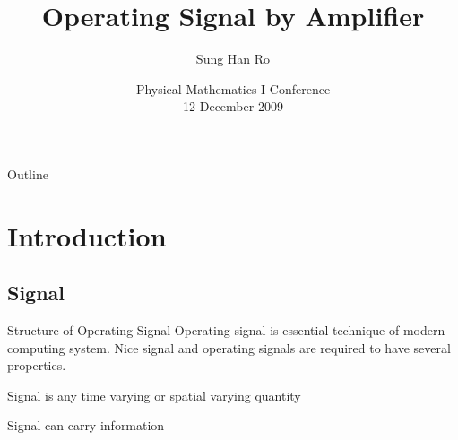 \documentclass[9pt]{beamer}
\begin{document}
\title{Operating Signal by Amplifier}
\author{Sung Han Ro}
\date{Physical Mathematics I Conference\\
12 December 2009}
\begin{frame}
\titlepage
\end{frame}
\begin{frame}{Outline}
\tableofcontents
\end{frame}

\section{Introduction}

\subsection{Signal}
\begin{frame}{Structure of Operating Signal}
Operating signal is essential technique of modern computing system. Nice signal and operating signals are required to have several properties.

\begin{itemize}

\begin{itemize}
 {
\item Signal is any time varying or spatial varying quantity
\item Signal can carry information
}
\end{itemize}


\begin{itemize}
\end{itemize}

\end{itemize}
\end{frame}
\end{document}
